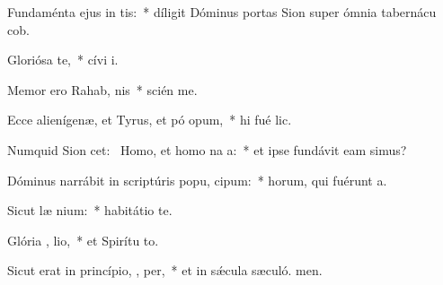\item Fundaménta ejus in  tis:~* díligit Dóminus portas Sion super ómnia tabernácu cob.
\item Gloriósa    te,~* cívi i.
\item Memor ero Rahab,  nis~* scién me.
\item Ecce alienígenæ, et Tyrus, et pó opum,~* hi fué lic.
\item Numquid Sion cet:~\pscross{} Homo, et homo na   a:~* et ipse fundávit eam simus?
\item Dóminus narrábit in scriptúris popu,  cipum:~* horum, qui fuérunt  a.
\item Sicut læ nium:~* habitátio   te.
\item Glória ,  lio,~* et Spirítu to.
\item Sicut erat in princípio,  ,  per,~* et in sǽcula sæculó. men.
